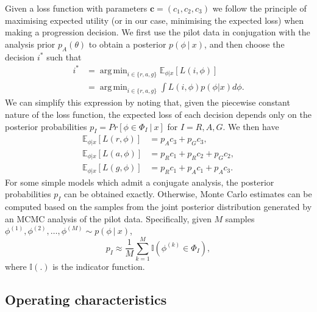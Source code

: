 \documentclass[AMA,STIX1COL]{WileyNJD-v2}
\DeclareMathOperator*{\argmin}{arg\,min}
\begin{document}

Given a loss function with parameters $\mathbf{c} = (c_1, c_2, c_3)$ we follow the principle of maximising expected utility (or in our case, minimising the expected loss) when making a progression decision. We first use the pilot data in conjugation with the analysis prior $p_{A}(\theta)$ to obtain a posterior $p(\phi ~|~ x)$, and then choose the decision $i^{*}$ such that 
\begin{align}
i^{*} & = \argmin_{i \in \{r,a,g\}} \mathbb{E}_{\phi | x} [ L(i, \phi) ] \\
 & = \argmin_{i \in \{r,a,g\}} \int L(i, \phi) p(\phi | x) d\phi.
\end{align}
We can simplify this expression by noting that, given the piecewise constant nature of the loss function, the expected loss of each decision depends only on the posterior probabilities $p_{I} =  Pr[\phi \in \Phi_{I} ~|~ x]$ for $I = R, A, G$. We then have
\begin{align}\label{eqn:exp_loss}
\mathbb{E}_{\phi | x} [ L(r, \phi) ] & = p_{A}c_{3} + p_{G}c_{3}, \\
\mathbb{E}_{\phi | x} [ L(a, \phi) ] & = p_{R}c_{1} + p_{R}c_{2} + p_{G}c_{2}, \\
\mathbb{E}_{\phi | x} [ L(g, \phi) ] & = p_{R}c_{1} + p_{A}c_{1} + p_{A}c_{3}.
\end{align}
For some simple models which admit a conjugate analysis, the posterior probabilities $p_I$ can be obtained exactly. Otherwise, Monte Carlo estimates can be computed based on the samples from the joint posterior distribution generated by an MCMC analysis of the pilot data. Specifically, given $M$ samples $\phi^{(1)}, \phi^{(2)}, \ldots , \phi^{(M)} \sim p(\phi ~|~ x)$, 
\begin{equation}
p_I \approx \frac{1}{M} \sum_{k = 1}^{M}  \mathbb{I}(\phi^{(k)} \in \Phi_I),
\end{equation}
where $\mathbb{I}(.)$ is the indicator function.

\subsection{Operating characteristics}\label{sec:evaluation}
\end{document}
